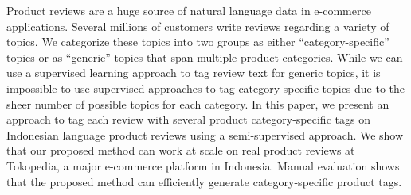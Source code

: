 Product reviews are a huge source of natural language data in e-commerce applications. Several millions of customers write reviews regarding a variety of topics. We categorize these topics into two groups as either ``category-specific'' topics or as ``generic'' topics that span multiple product categories. While we can use a supervised learning approach to tag review text for generic topics, it is impossible to use supervised approaches to tag category-specific topics due to the sheer number of possible topics for each category. In this paper, we present an approach to tag each review with several product category-specific tags on Indonesian language product reviews using a semi-supervised approach. We show that our proposed method can work at scale on real product reviews at Tokopedia, a major e-commerce platform in Indonesia. Manual evaluation shows that the proposed method can efficiently generate category-specific product tags.
